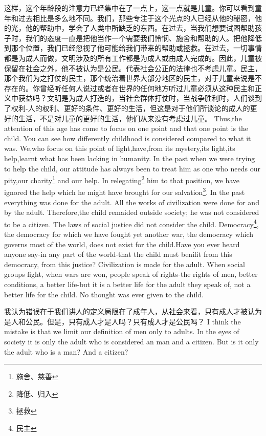 \documentclass[lang=cn,10pt]{elegantbook}
\begin{document}
\begin{tcolorbox}[title=译文,
colback=red!5!white,
colframe=red!75!black,
fonttitle=\bfseries]
这样，这个年龄段的注意力已经集中在了一点上，这一点就是儿童。你可以看到童年和过去相比是多么地不同。我们，那些专注于这个光点的人已经从他的秘密，他的光，他的帮助中，学会了人类中所缺乏的东西。在过去，当我们想要试图帮助孩子时，我们的态度一直是把他当作一个需要我们怜悯、施舍和帮助的人。把他降低到那个位置，我们已经忽视了他可能给我们带来的帮助或拯救。在过去，一切事情都是为成人而做，文明涉及的所有工作都是为成人或由成人完成的。因此，儿童被保留在社会之外，他不被认为是公民。代表社会公正的法律也不考虑儿童。民主，那个我们为之打仗的民主，那个统治着世界大部分地区的民主，对于儿童来说是不存在的。你曾经听任何人说过或者在世界的任何地方听过儿童必须从这种民主和正义中获益吗？文明是为成人打造的，当社会群体打仗时，当战争胜利时，人们谈到了权利-人的权利、更好的条件、更好的生活，但这是对于他们所谈论的成人的更好的生活，不是对儿童的更好的生活，他们从来没有考虑过儿童。
Thus,the attention of this age has come to focus on one point and that one point is the child. You can see how differently childhood is considered compared to what it was. We,who focus on this point of light,have,from its mystery,its light,its help,learnt what has been lacking in humanity. In the past when we were trying to help the child, our attitude has always been to treat him as one who needs our pity,our charity\footnote{施舍、慈善} and our help. In relegating\footnote{降低、归入} him to that position, we have ignored the help which he might have brought for our salvation\footnote{拯救}. In the past everything was done for the adult. All the works of civilization were done for and by the adult. Therefore,the child remaided outside society; he was not considered to be a citizen. The laws of social justice did not consider the child. Democracy\footnote{民主}, the democracy for which we have fought yet another war, the democracy which governs most of the world, does not exist for the child.Have you ever heard anyone say-in any part of the world-that the child must benifit from this democracy, from this justice? Civilization is made for the adult. When social groups fight, when wars are won, people speak of rights-the rights of men, better conditions, a better life-but it is a better life for the adult they speak of, not a better life for the child. No thought was ever given to the child.
\end{tcolorbox}

\begin{tcolorbox}[title=译文,
colback=red!5!white,
colframe=red!75!black,
fonttitle=\bfseries]
我认为错误在于我们讲人的定义局限在了成年人，从社会来看，只有成人才被认为是人和公民。但是，只有成人才是人吗？只有成人才是公民吗？
I think the mistake is that we limit our definition of men only to adults. In the eyes of society it is only the adult who is considered an man and a citizen. But is it only the adult who is a man? And a citizen?
\end{tcolorbox}
\end{document}
